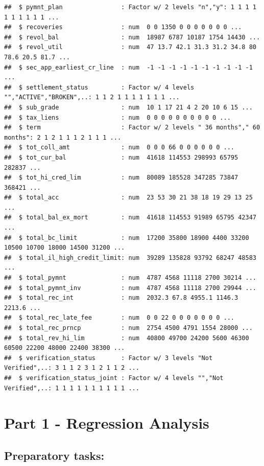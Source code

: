 \documentclass[]{article}
\begin{document}
\begin{verbatim}
##  $ pymnt_plan                : Factor w/ 2 levels "n","y": 1 1 1 1 1 1 1 1 1 1 ...
##  $ recoveries                : num  0 0 1350 0 0 0 0 0 0 0 ...
##  $ revol_bal                 : num  18987 6787 10187 1754 14430 ...
##  $ revol_util                : num  47 13.7 42.1 31.3 31.2 34.8 80 78.6 20.5 81.7 ...
##  $ sec_app_earliest_cr_line  : num  -1 -1 -1 -1 -1 -1 -1 -1 -1 -1 ...
##  $ settlement_status         : Factor w/ 4 levels "","ACTIVE","BROKEN",..: 1 1 2 1 1 1 1 1 1 1 ...
##  $ sub_grade                 : num  10 1 17 21 4 2 20 10 6 15 ...
##  $ tax_liens                 : num  0 0 0 0 0 0 0 0 0 0 ...
##  $ term                      : Factor w/ 2 levels " 36 months"," 60 months": 2 1 2 1 1 1 2 1 1 1 ...
##  $ tot_coll_amt              : num  0 0 0 66 0 0 0 0 0 0 ...
##  $ tot_cur_bal               : num  41618 114553 298993 65795 282837 ...
##  $ tot_hi_cred_lim           : num  80089 185528 347285 73847 368421 ...
##  $ total_acc                 : num  23 53 30 21 38 18 19 29 13 25 ...
##  $ total_bal_ex_mort         : num  41618 114553 91989 65795 42347 ...
##  $ total_bc_limit            : num  17200 35800 18900 4400 33200 10500 10700 18000 14500 31200 ...
##  $ total_il_high_credit_limit: num  39289 135828 93792 68247 48583 ...
##  $ total_pymnt               : num  4787 4568 11118 2700 30214 ...
##  $ total_pymnt_inv           : num  4787 4568 11118 2700 29944 ...
##  $ total_rec_int             : num  2032.3 67.8 4955.1 1146.3 2213.6 ...
##  $ total_rec_late_fee        : num  0 0 22 0 0 0 0 0 0 0 ...
##  $ total_rec_prncp           : num  2754 4500 4791 1554 28000 ...
##  $ total_rev_hi_lim          : num  40800 49700 24200 5600 46300 60500 22200 48000 22400 38300 ...
##  $ verification_status       : Factor w/ 3 levels "Not Verified",..: 3 1 1 2 3 1 2 1 1 2 ...
##  $ verification_status_joint : Factor w/ 4 levels "","Not Verified",..: 1 1 1 1 1 1 1 1 1 1 ...
\end{verbatim}

\pagebreak

\hypertarget{part-1---regression-analysis}{%
\section{Part 1 - Regression
Analysis}\label{part-1---regression-analysis}}

\hypertarget{preparatory-tasks}{%
\subsection{Preparatory tasks:}\label{preparatory-tasks}}
\end{document}
